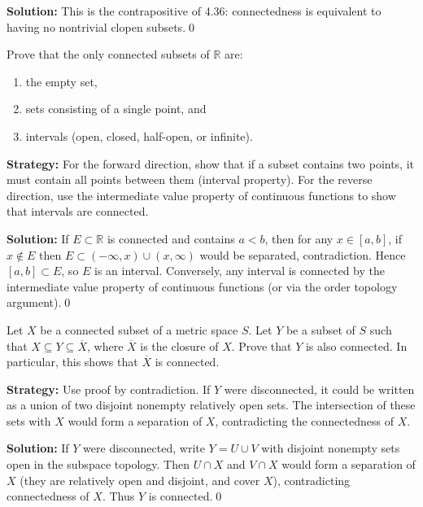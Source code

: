 \bigskip\noindent\textbf{Solution:}
This is the contrapositive of 4.36: connectedness is equivalent to having no nontrivial clopen subsets.\qed



\begin{problembox}
Prove that the only connected subsets of $\mathbb{R}$ are:
\begin{enumerate}[label=(\alph*)]
\item the empty set,
\item sets consisting of a single point, and
\item intervals (open, closed, half-open, or infinite).
\end{enumerate}
\end{problembox}

\noindent\textbf{Strategy:} For the forward direction, show that if a subset contains two points, it must contain all points between them (interval property). For the reverse direction, use the intermediate value property of continuous functions to show that intervals are connected.

\bigskip\noindent\textbf{Solution:}
If $E\subset\mathbb{R}$ is connected and contains $a<b$, then for any $x\in[a,b]$, if $x\notin E$ then $E\subset(-\infty,x)\cup(x,\infty)$ would be separated, contradiction. Hence $[a,b]\subset E$, so $E$ is an interval. Conversely, any interval is connected by the intermediate value property of continuous functions (or via the order topology argument).\qed



\begin{problembox}
Let $X$ be a connected subset of a metric space $S$. Let $Y$ be a subset of $S$ such that $X \subseteq Y \subseteq \overline{X}$, where $\overline{X}$ is the closure of $X$. Prove that $Y$ is also connected. In particular, this shows that $\overline{X}$ is connected.
\end{problembox}

\noindent\textbf{Strategy:} Use proof by contradiction. If $Y$ were disconnected, it could be written as a union of two disjoint nonempty relatively open sets. The intersection of these sets with $X$ would form a separation of $X$, contradicting the connectedness of $X$.

\bigskip\noindent\textbf{Solution:}
If $Y$ were disconnected, write $Y=U\cup V$ with disjoint nonempty sets open in the subspace topology. Then $U\cap X$ and $V\cap X$ would form a separation of $X$ (they are relatively open and disjoint, and cover $X$), contradicting connectedness of $X$. Thus $Y$ is connected.\qed



